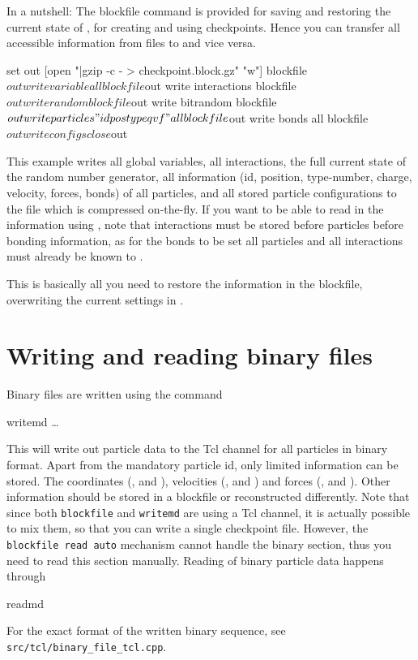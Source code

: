In a nutshell: The blockfile command is provided for saving and
restoring the current state of \es, \eg for creating and using
checkpoints. Hence you can transfer all accessible information from
files to \es and vice versa.

\begin{tclcode}
set out [open "|gzip -c - > checkpoint.block.gz" "w"]
blockfile $out write variable all
blockfile $out write interactions
blockfile $out write random
blockfile $out write bitrandom
blockfile $out write particles "id pos type q v f" all
blockfile $out write bonds all
blockfile $out write configs
close $out 
\end{tclcode}

This example writes all global variables, all interactions, the full
current state of the random number generator, all information (\ie id,
position, type-number, charge, velocity, forces, bonds) of all
particles, and all stored particle configurations to the file
 which is compressed on-the-fly.  If you want
to be able to read in the information using \es, note that
interactions must be stored before particles before bonding
information, as for the bonds to be set all particles and all
interactions must already be known to \es.

This is basically all you need to restore the information in the
blockfile, overwriting the current settings in \es.

\section{Writing and reading binary files}

Binary files are written using the command
\begin{essyntax}
  writemd  \dots
\end{essyntax}
This will write out particle data to the Tcl channel  for
all particles in binary format. Apart from the mandatory particle id,
only limited information can be stored. The coordinates (,
 and ), velocities (,  and
) and forces (,  and ). Other
information should be stored in a blockfile or reconstructed
differently. Note that since both \texttt{blockfile} and
\texttt{writemd} are using a Tcl channel, it is actually possible to
mix them, so that you can write a single checkpoint file. However, the
\texttt{blockfile read auto} mechanism cannot handle the binary
section, thus you need to read this section manually. Reading of
binary particle data happens through
\begin{essyntax}
  readmd 
\end{essyntax}
For the exact format of the written binary sequence, see
\texttt{src/tcl/binary_file_tcl.cpp}.


